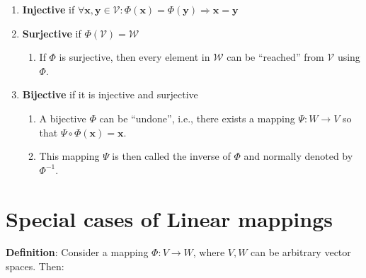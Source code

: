 \begin{enumerate}
    \item \textbf{Injective} if $\forall \bm{x}, \bm{y} \in \mathcal{V} : \Phi(\bm{x}) = \Phi(\bm{y}) \Rightarrow \bm{x} = \bm{y}$
    \hfill \cite{mfml/book/mml/Deisenroth-Faisal-Ong}

    \item \textbf{Surjective} if $\Phi(\mathcal{V}) = \mathcal{W}$
    \hfill \cite{mfml/book/mml/Deisenroth-Faisal-Ong}
    \begin{enumerate}
        \item If $\Phi$ is surjective, then every element in $\mathcal{W}$ can be “reached” from $\mathcal{V}$ using $\Phi$.
        \hfill \cite{mfml/book/mml/Deisenroth-Faisal-Ong}
    \end{enumerate}
    
    \item \textbf{Bijective} if it is injective and surjective
    \hfill \cite{mfml/book/mml/Deisenroth-Faisal-Ong}
    \begin{enumerate}
        \item A bijective $\Phi$ can be “undone”, i.e., there exists a mapping $\Psi : W \to V$ so that $\Psi \circ \Phi(\bm{x}) = \bm{x}$.
        \hfill \cite{mfml/book/mml/Deisenroth-Faisal-Ong}

        \item This mapping $\Psi$ is then called the inverse of $\Phi$ and normally denoted by $\Phi^{-1}$.
        \hfill \cite{mfml/book/mml/Deisenroth-Faisal-Ong}
    \end{enumerate}    

\end{enumerate}


















\section{Special cases of Linear mappings}

\textbf{Definition}: Consider a mapping $\Phi : V \to W$, where $V, W$ can be arbitrary vector spaces. 
Then:
\hfill \cite{mfml/book/mml/Deisenroth-Faisal-Ong}


